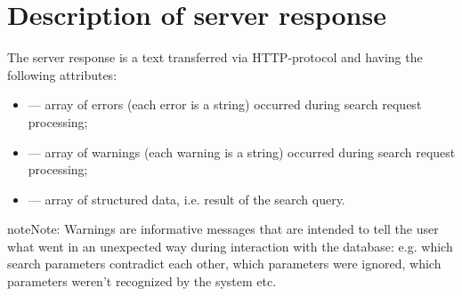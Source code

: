 \documentclass[letterpaper,10pt,english]{sphinxmanual}
\begin{document}
\section{Description of server response}
\label{\detokenize{http_api:description-of-server-response}}
The server response is a  text transferred via HTTP-protocol
and having the following attributes:
\begin{itemize}
\item {} 
 — array of errors (each error is a string) occurred during search request processing;

\item {} 
 — array of warnings (each warning is a string) occurred during search request processing;

\item {} 
 — array of structured data, i.e. result of the search query.

\end{itemize}

\begin{sphinxadmonition}{note}{Note:}
Warnings are informative messages that are intended to tell
the user what went in an unexpected way during interaction with the database:
e.g. which search parameters contradict each other,
which parameters were ignored, which parameters weren’t
recognized by the system etc.
\end{sphinxadmonition}
\end{document}
